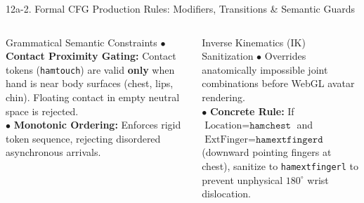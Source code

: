 \documentclass[aspectratio=169,xcolor={table,dvipsnames}]{beamer}
\begin{document}
\begin{frame}[t]{12a-2. Formal CFG Production Rules: Modifiers, Transitions \& Semantic Guards}
\vspace{1.5mm}
\begin{columns}[T]
    \begin{block}{Grammatical Semantic Constraints}
        \fontsize{6.6pt}{8.4pt}\selectfont
        $\bullet$ \textbf{Contact Proximity Gating:} Contact tokens (\texttt{hamtouch}) are valid \textbf{only} when hand is near body surfaces (chest, lips, chin). Floating contact in empty neutral space is rejected.\\
        $\bullet$ \textbf{Monotonic Ordering:} Enforces rigid token sequence, rejecting disordered asynchronous arrivals.
    \end{block}

    \begin{block}{Inverse Kinematics (IK) Sanitization}
        \fontsize{6.6pt}{8.4pt}\selectfont
        $\bullet$ Overrides anatomically impossible joint combinations before WebGL avatar rendering.\\
        $\bullet$ \textbf{Concrete Rule:} If $\text{Location} = \texttt{hamchest}$ and $\text{ExtFinger} = \texttt{hamextfingerd}$ (downward pointing fingers at chest), sanitize to \texttt{hamextfingerl} to prevent unphysical $180^\circ$ wrist dislocation.
    \end{block}
\end{columns}
\end{frame}
\end{document}
